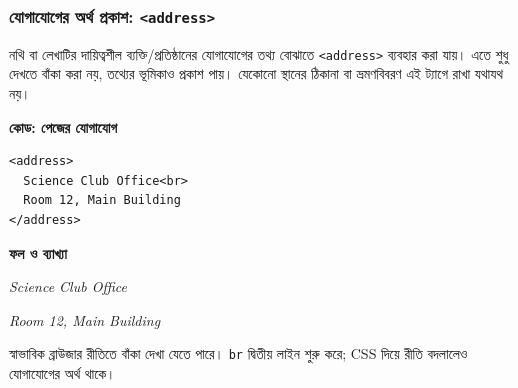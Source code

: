 \subsubsection{যোগাযোগের অর্থ প্রকাশ: \texttt{<address>}}
নথি বা লেখাটির দায়িত্বশীল ব্যক্তি/প্রতিষ্ঠানের যোগাযোগের তথ্য বোঝাতে \texttt{<address>} ব্যবহার করা যায়। এতে শুধু দেখতে বাঁকা করা নয়, তথ্যের ভূমিকাও প্রকাশ পায়। যেকোনো স্থানের ঠিকানা বা ভ্রমণবিবরণ এই ট্যাগে রাখা যথাযথ নয়।
\par\noindent\begin{minipage}[t]{.50\linewidth}\vspace{0pt}\small
\textbf{\color{chFourTeal}কোড: পেজের যোগাযোগ}\par
\begin{verbatim}
<address>
  Science Club Office<br>
  Room 12, Main Building
</address>
\end{verbatim}
\end{minipage}\hfill
\begin{minipage}[t]{.46\linewidth}\vspace{0pt}\small
\textbf{\color{chFourTeal}ফল ও ব্যাখ্যা}\par
\textit{Science Club Office}\par
\textit{Room 12, Main Building}\par
স্বাভাবিক ব্রাউজার রীতিতে বাঁকা দেখা যেতে পারে। \texttt{br} দ্বিতীয় লাইন শুরু করে; CSS দিয়ে রীতি বদলালেও যোগাযোগের অর্থ থাকে।
\end{minipage}\par
